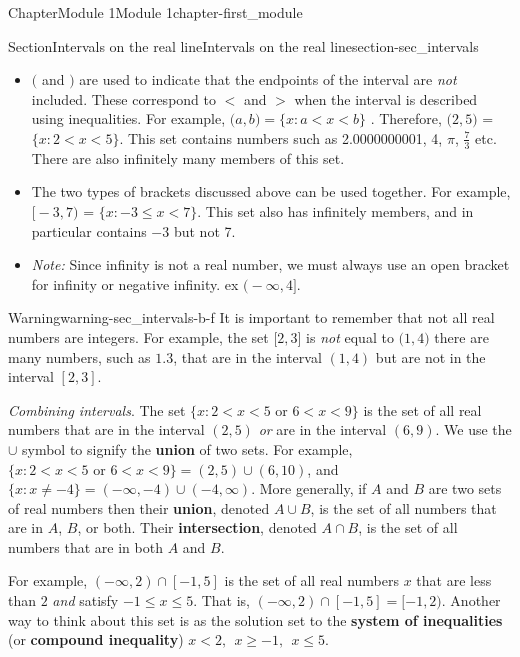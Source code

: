 \documentclass[oneside,10pt,]{book}
\newcommand{\terminology}[1]{\textbf{#1}}
\newcommand{\lt}{<}
\begin{document}
\begin{chapterptx}{Chapter}{Module 1}{}{Module 1}{}{}{chapter-first_module}
\begin{sectionptx}{Section}{Intervals on the real line}{}{Intervals on the real line}{}{}{section-sec_intervals}
\begin{introduction}{}
\begin{itemize}[label=\textbullet]
\item{}\(\big(\) and \(\big)\) are used to indicate that the endpoints of the interval are \emph{not} included. These correspond to \(\lt\) and \(>\) when the interval is described using inequalities.  For example, \(\big( a, b \big) = \{ x: a \lt x \lt b\}\) . Therefore, \(\big( 2, 5 \big)\) = \(\{ x : 2 < x < 5 \}\).  This set contains numbers such as 2.0000000001, 4, \(\pi\), \(\frac{7}{3}\) etc.  There are also infinitely many members of this set.%
\item{}The two types of brackets discussed above can be used together.  For example, \(\big[ -3, 7 \big)\) = \(\{ x : -3 \leq x < 7 \}\).  This set also has infinitely members, and in particular contains \(-3\) but not 7.%
\item{}\emph{Note:} Since infinity is not a real number, we must always use an open bracket for infinity or negative infinity. ex \(\big ( -\infty , 4 \big ]\).%
\end{itemize}
\begin{warning}{Warning}{}{warning-sec_intervals-b-f}%
It is important to remember that not all real numbers are integers.  For example, the set \(\big [ 2, 3 \big ]\) is \emph{not} equal to \(\big ( 1, 4 \big )\)\textemdash{} there are many numbers, such as \(1.3\), that are in the interval \((1,4)\) but are not in the interval \([2,3]\).\end{warning}
\emph{Combining intervals}.  The set \(\{x : 2 < x < 5 \mbox{ or } 6 < x < 9\}\) is the set of all real numbers that are in the interval \((2,5)\) \emph{or} are in the interval \((6,9)\).  We use the \(\cup\) symbol to signify the \terminology{union} of two sets.  For example, \(\{x : 2 < x < 5 \mbox{ or } 6 < x < 9\}=(2,5)\cup(6,10)\), and%
\(\{x : x\neq -4 \} = (-\infty,-4)\cup(-4,\infty)\). More generally, if \(A\) and \(B\) are two sets of real numbers then their \terminology{union}, denoted \(A \cup B\), is the set of all numbers that are in \(A\), \(B\), or both.  Their \terminology{intersection}, denoted \(A \cap B\), is the set of all numbers that are in both \(A\) and \(B\).%
\par
For example, \((-\infty, 2) \cap [-1, 5]\) is the set of all real numbers \(x\) that are less than \(2\) \emph{and} satisfy \(-1\leq x \leq 5\).  That is, \((-\infty, 2) \cap [-1,5]=[-1,2)\).  Another way to think about this set is as the solution set to the \terminology{system of inequalities} (or \terminology{compound inequality}) \(x \lt 2,\ \ x \geq -1,\ \ x \leq 5\).%
\end{introduction}%

\end{sectionptx}
\end{chapterptx}
\end{document}
